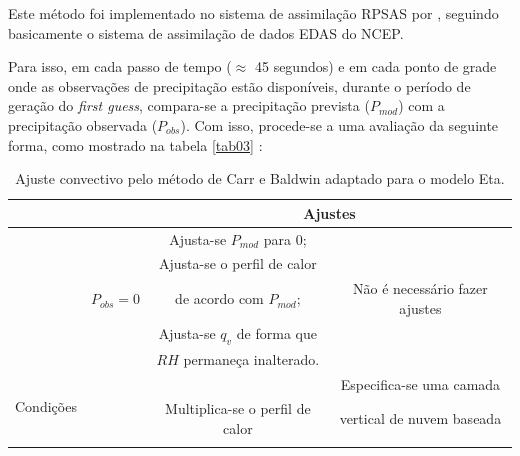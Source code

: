 Este método foi implementado no sistema de assimilação RPSAS por , seguindo basicamente o sistema de assimilação de dados EDAS do NCEP.

Para isso, em cada passo de tempo ($\approx$ 45 segundos) e em cada ponto de grade onde as observações de precipitação estão disponíveis, durante o período de geração do \textit{first guess}, compara-se a precipitação prevista ($P_{mod}$) com a precipitação observada ($P_{obs}$). Com isso, procede-se a uma avaliação da seguinte forma, como mostrado na tabela \autoref{tab03} \cite{linetal01}:

\begin{table}[!h]
\caption{Ajuste convectivo pelo método de Carr e Baldwin adaptado para o \-mo\-de\-lo Eta.}
\label{tab03}
\centering
\begin{tabular}{|c|c|c|c|}
\cline{3-4} 
\multicolumn{1}{c}{} &  & \multicolumn{2}{c|}{Ajustes}\tabularnewline
\hline 
\begin{sideways}

\end{sideways} &  & Ajusta-se $P_{mod}$ para 0; & \tabularnewline
\begin{sideways}

\end{sideways} &  & Ajusta-se o perfil de calor & \tabularnewline
\begin{sideways}

\end{sideways} & $P_{obs}=0$ & de acordo com $P_{mod}$; & Não é necessário fazer ajustes\tabularnewline
\begin{sideways}

\end{sideways} &  & Ajusta-se $q_{v}$ de forma que & \tabularnewline
\begin{sideways}

\end{sideways} &  & $RH$ permaneça inalterado. & \tabularnewline
\cline{2-4} 
\multirow{2}{0pt}{\begin{sideways}Condições\end{sideways}}
\begin{sideways}

\end{sideways} &  &  & Especifica-se uma camada\tabularnewline
 
\begin{sideways}

\end{sideways} &  & Multiplica-se o perfil de calor & vertical de nuvem baseada\tabularnewline
\begin{sideways}


\end{sideways}
\end{tabular}
\end{table}
